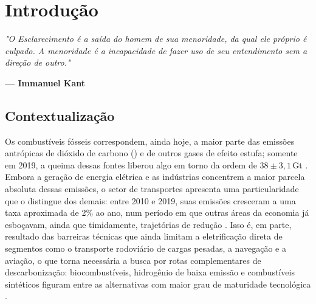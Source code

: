 \chapter{Introdução}
\label{introducao}

\epigraph{\textit{"O Esclarecimento é a saída do homem de sua menoridade, da qual ele próprio é culpado. A menoridade é a incapacidade de fazer uso de seu entendimento sem a direção de outro."}}{\textbf{--- Immanuel Kant}}

\section{Contextualização}

Os combustíveis fósseis correspondem, ainda hoje, a maior parte das emissões antrópicas de dióxido de carbono () e de outros gases de efeito estufa; somente em 2019, a queima dessas fontes liberou algo em torno da ordem de $38 \pm 3{,}1$\,Gt  \cite{ipcc2023}. Embora a geração de energia elétrica e as indústrias concentrem a maior parcela absoluta dessas emissões, o setor de transportes apresenta uma particularidade que o distingue dos demais: entre 2010 e 2019, suas emissões cresceram a uma taxa aproximada de 2\% ao ano, num período em que outras áreas da economia já esboçavam, ainda que timidamente, trajetórias de redução \cite{ipcc2023}. Isso é, em parte, resultado das barreiras técnicas que ainda limitam a eletrificação direta de segmentos como o transporte rodoviário de cargas pesadas, a navegação e a aviação, o que torna necessária a busca por rotas complementares de descarbonização: biocombustíveis, hidrogênio de baixa emissão e combustíveis sintéticos figuram entre as alternativas com maior grau de maturidade tecnológica \cite{ipcc2023}.

